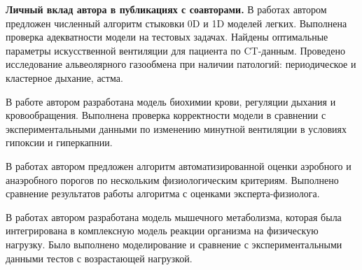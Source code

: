 \textbf{Личный вклад автора в публикациях с соавторами.} В работах \cite{GolovComp2017,Simakov2015} автором предложен численный алгоритм стыковки 0D и 1D моделей легких. Выполнена проверка адекватности модели на тестовых задачах. Найдены оптимальные параметры искусственной вентиляции для пациента по CT-данным. Проведено исследование альвеолярного газообмена при наличии патологий: периодическое и кластерное дыхание, астма.

В работе \cite{GolovCmodel2017} автором разработана модель биохимии крови, регуляции дыхания и кровообращения. Выполнена проверка корректности модели в сравнении с экспериментальными данными по изменению минутной вентиляции в условиях гипоксии и гиперкапнии.

В работах \cite{GolovIt2017,GolovSp2016, TimmeSp2016} автором предложен алгоритм автоматизированной оценки аэробного и анаэробного порогов по нескольким физиологическим критериям. Выполнено сравнение результатов работы алгоритма с оценками эксперта-физиолога.

В работах \cite{GolovSp2015,GolovEkb2016} автором разработана модель мышечного метаболизма, которая была интегрирована в комплексную модель реакции организма на физическую нагрузку. Было выполнено моделирование и сравнение с экспериментальными данными тестов с возрастающей нагрузкой.
